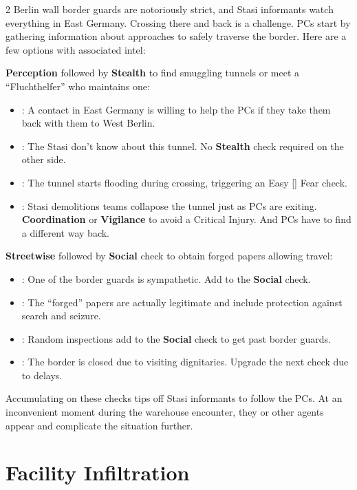 \documentclass{book}
\newcommand{\df}{\DifficultyDie }
\newcommand{\stb}{\SetbackDie }
\newcommand{\ch}{\ChallengeDie }
\begin{document}
\begin{multicols*}{2}
Berlin wall border guards are notoriously strict, and Stasi informants watch everything in East Germany.  Crossing there and back is a challenge.  PCs start by gathering information about approaches to safely traverse the border.  Here are a few options with associated intel:

\df\df\stb \textbf{Perception} followed by \df\df \textbf{Stealth} to find smuggling tunnels or meet a ``Fluchthelfer'' who maintains one:
    \begin{itemize}
    \setlength\itemsep{-.5em}
        \item \Advantage\Advantage: A contact in East Germany is willing to help the PCs if they take them back with them to West Berlin.
        \item \Triumph: The Stasi don't know about this tunnel.  No \textbf{Stealth} check required on the other side.
        \item \Threat\Threat: The tunnel starts flooding during crossing, triggering an Easy [\df] Fear check.
        \item \Despair: Stasi demolitions teams collapose the tunnel just as PCs are exiting.  \df\df \textbf{Coordination} or \textbf{Vigilance} to avoid a Critical Injury.  And PCs have to find a different way back.
    \end{itemize}

\df\df \textbf{Streetwise} followed by \ch\df \textbf{Social} check to obtain forged papers allowing travel:
    \begin{itemize}
    \setlength\itemsep{-.5em}
    \item \Advantage\Advantage: One of the border guards is sympathetic.  Add \Success to the \textbf{Social} check.
        \item \Triumph:  The ``forged'' papers are actually legitimate and include protection against search and seizure.
        \item \Threat\Threat: Random inspections add \stb to the \textbf{Social} check to get past border guards.
        \item \Despair: The border is closed due to visiting dignitaries.  Upgrade the next check due to delays.
    \end{itemize}

Accumulating {\Threat\Threat\Threat } on these checks tips off Stasi informants to follow the PCs.  At an inconvenient moment during the warehouse encounter, they or other agents appear and complicate the situation further.

\section{Facility Infiltration}


\end{multicols*}
\end{document}

